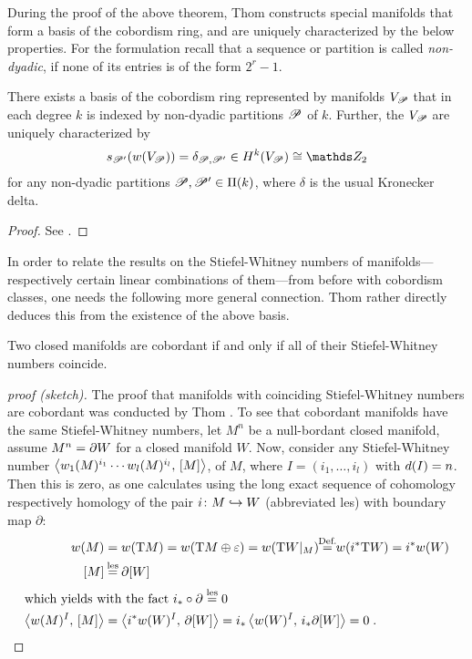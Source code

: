 During the proof of the above theorem, Thom constructs special
manifolds that form a basis of the cobordism ring,
and are uniquely characterized by the below properties.
For the formulation recall that a sequence or partition is called
\emph{non-dyadic}, if none of its entries is of the form $2^r-1$.
\begin{Thm}\label{thm:basiscobordismring}
  There exists a basis of the cobordism ring represented by manifolds
  $V_{\mathscr{P}}$ that in each degree $k$ is indexed by non-dyadic
  partitions $\mathscr{P}$ of $k$. Further, the $V_{\mathscr{P}}$ are uniquely
  characterized by
  \begin{gather*}
    \s{\Part'}(\W{V_\Part}) = \delta_{\Part,\Part'}
    \in \H^k(V_{\Part})\cong \Zmod2
  \end{gather*}
  for any non-dyadic partitions $\mathscr{P},\mathscr{P}'\in\Pi({k})$,
  where $\delta$ is the usual Kronecker delta.
  \begin{proof}
    See \cite[Section~IV.5, proof of Theorem~IV.9]{thom}.
  \end{proof}
\end{Thm}

In order to relate the results on the Stiefel-Whitney numbers of
manifolds---respectively certain linear combinations of them---from
before with cobordism classes, one needs the following more general
connection. Thom rather directly deduces this from the existence of
the above basis.
\begin{Thm}[Thom]\label{thm:cobordantiffswnumscoincide}
  Two closed manifolds are cobordant if and only if all of their
  Stiefel-Whitney numbers coincide.
  \begin{proof}[proof (sketch)]
    The proof that manifolds with coinciding Stiefel-Whitney numbers
    are cobordant was conducted by Thom \cite[Theorem IV.10]{thom}.
    To see that cobordant manifolds have the same Stiefel-Whitney
    numbers, let $M^n$ be a null-bordant closed manifold, \idest
    assume $M^n=\partial{W}$ for a closed manifold $W$. Now, consider
    any Stiefel-Whitney number 
    $\left\langle {w_{1}}(M)^{i_1}\dotsm{w_{l}}(M)^{i_l},\, [M] \right\rangle$,
    of $M$, where $I=(i_1,\dotsc,i_l)$ with $d(I)=n$.
    Then this is zero, as one calculates using the long
    exact sequence of cohomology respectively homology of the pair
    $i\colon M\hookrightarrow W$ (abbreviated les) with boundary map
    $\partial$:
    \begin{align*}
      \W{M}
      &= \W{\T M}
        = \W{\T M\oplus\trivbdl}
        = \W{\T W|_{M}}
        \cequalsby{Def.} \W{\pb i \T W} = \pb i \W{W} \\
      \fundcl M
      &\cequalsby{les} \partial \fundcl{W} \\
      \intertext{which yields with the fact
      $\pf i\circ\partial\overset{\text{les}}= 0$}
      \capped{\W{M}^I}{\fundcl M}
      &= \capped{\pb i\W{W}^I}{\partial\fundcl{W}}
        = \pf i\capped{\W{W}^I}{\pf i\partial \fundcl{W}}
        = 0
        \;.
        \qedhere
    \end{align*}
  \end{proof}
\end{Thm}

